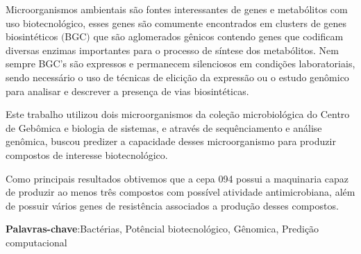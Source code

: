 \setlength{\absparsep}{18pt} %
\begin{resumo}
Microorganismos ambientais são fontes interessantes de genes e metabólitos
com uso biotecnológico, esses genes são comumente encontrados em clusters de genes biosintéticos $($BGC$)$
que são aglomerados gênicos contendo genes que codificam diversas enzimas importantes
para o processo de síntese dos metabólitos. Nem sempre BGC's são expressos e permanecem 
silenciosos em condições laboratoriais, sendo necessário o uso de técnicas de elicição
da expressão ou o estudo genômico para analisar e descrever a presença de vias biosintéticas.

Este trabalho utilizou dois microorganismos da coleção microbiológica do
Centro de Gebômica e biologia de sistemas, e através de sequênciamento
e análise genômica, buscou predizer a capacidade desses microorganismo
para produzir  compostos de interesse biotecnológico.

Como principais resultados obtivemos que a cepa 094 possui a maquinaria
capaz de produzir ao menos três compostos com possível atividade antimicrobiana, 
além de possuir vários genes de resistência associados a produção desses compostos.

\textbf{Palavras-chave}:Bactérias, Potêncial biotecnológico, Gênomica, Predição computacional
\end{resumo}

%
% 

% 

%  
